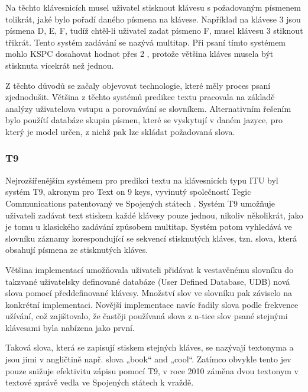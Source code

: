 \documentclass{article}
\begin{document}
Na těchto klávesnicích musel uživatel stisknout klávesu s požadovaným písmenem tolikrát, jaké bylo pořadí daného písmena na klávese. Například na klávese 3 jsou písmena D, E, F, tudíž chtěl-li uživatel zadat písmeno F, musel klávesu 3 stiknout třikrát. Tento systém zadávání se nazývá multitap. Při psaní tímto systémem mohlo KSPC dosahovat hodnot přes 2 \cite{dXVv6nPb2KifFXYv}, protože většina kláves musela být stisknuta vícekrát než jednou. 


Z těchto důvodů se začaly objevovat technologie, které měly proces psaní zjednodušit. Většina z těchto systémů predikce textu pracovala na základě analýzy uživatelova vstupu a porovnávání se slovníkem. Alternativním řešením bylo použítí databáze skupin písmen, které se vyskytují v daném jazyce, pro který je model určen, z nichž pak lze skládat požadovaná slova.

\subsubsection{T9}


Nejrozšířenějším systémem pro predikci textu na klávesnicích typu ITU byl systém T9, akronym pro Text on 9 keys, vyvinutý společností Tegic Communications \cite{Edq6tEyjOSzk54RQ} patentovaný ve Spojených státech \cite{Grover1998}. Systém T9 umožňuje uživateli zadávat text stiskem každé klávesy pouze jednou, nikoliv několikrát, jako je tomu u klasického zadávání způsobem multitap. Systém potom vyhledává ve slovníku záznamy korespondující se sekvencí stisknutých kláves, tzn. slova, která obsahují písmena ze stisknutých kláves. 

Většina implementací umožňovala uživateli přidávat k vestavěnému slovníku do takzvané uživatelsky definované databáze (User Defined Database, UDB) nová slova pomocí předdefinované klávesy. Množství slov ve slovníku pak záviselo na konkrétní implementaci. Novější implementace navíc řadily slova podle frekvence užívání, což zajištovalo, že častěji používaná slova z n-tice slov psané stejnými klávesami byla nabízena jako první. 

Taková slova, která se zapisují stiskem stejných kláves, se nazývají textonyma \cite{ZORN2007} a jsou jimi v angličtině např. slova „book“ and „cool“. Zatímco obvykle tento jev pouze snižuje efektivitu zápisu pomocí T9, v roce 2010 záměna dvou textonym v textové zprávě vedla ve Spojených státech k vraždě. \cite{bjjL0GPb5QxyO1A8} 
\end{document}
